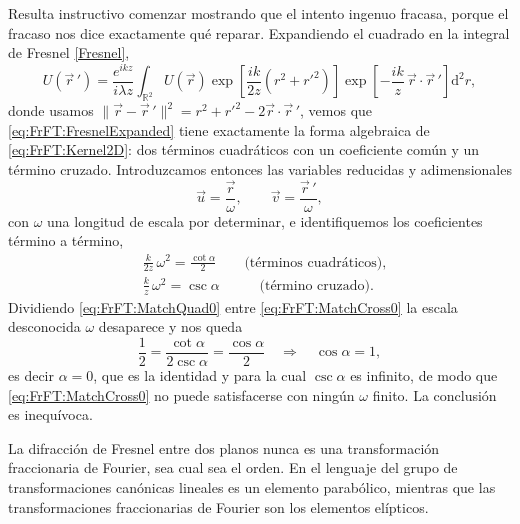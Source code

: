 			Resulta instructivo comenzar mostrando que el intento ingenuo fracasa, porque el fracaso nos dice exactamente qué reparar. Expandiendo el cuadrado en la integral de Fresnel \eqref{Fresnel},
			\begin{equation}\label{eq:FrFT:FresnelExpanded}
				U(\vec{r}\,') = \frac{e^{ikz}}{i\lambda z}\int_{\mathbb{R}^{2}} U(\vec{r})\exp\left[\frac{ik}{2z}\left(r^{2}+r'^{2}\right)\right]\exp\left[-\frac{ik}{z}\,\vec{r}\cdot\vec{r}\,'\right]\mathrm{d}^{2}r,
			\end{equation}
			donde usamos $\|\vec{r}-\vec{r}\,'\|^{2} = r^{2}+r'^{2}-2\vec{r}\cdot\vec{r}\,'$, vemos que \eqref{eq:FrFT:FresnelExpanded} tiene exactamente la forma algebraica de \eqref{eq:FrFT:Kernel2D}: dos términos cuadráticos con un coeficiente común y un término cruzado. Introduzcamos entonces las variables reducidas y adimensionales
			\begin{equation}\label{eq:FrFT:Reduced}
				\vec{u} = \frac{\vec{r}}{\omega}, \qquad \vec{v} = \frac{\vec{r}\,'}{\omega},
			\end{equation}
			con $\omega$ una longitud de escala por determinar, e identifiquemos los coeficientes término a término,
			\begin{align}
				& \frac{k}{2z}\,\omega^{2} = \frac{\cot\alpha}{2} \qquad \text{(términos cuadráticos)},\label{eq:FrFT:MatchQuad0}\\
				& \frac{k}{z}\,\omega^{2} = \csc\alpha \qquad\;\;\; \text{(término cruzado)}.\label{eq:FrFT:MatchCross0}
			\end{align}
			Dividiendo \eqref{eq:FrFT:MatchQuad0} entre \eqref{eq:FrFT:MatchCross0} la escala desconocida $\omega$ desaparece y nos queda
			\begin{equation*}
				\frac{1}{2} = \frac{\cot\alpha}{2\csc\alpha} = \frac{\cos\alpha}{2} \quad\Longrightarrow\quad \cos\alpha = 1,
			\end{equation*}
			es decir $\alpha = 0$, que es la identidad y para la cual $\csc\alpha$ es infinito, de modo que \eqref{eq:FrFT:MatchCross0} no puede satisfacerse con ningún $\omega$ finito. La conclusión es inequívoca.

			\begin{myteo}
				La difracción de Fresnel entre dos planos nunca es una transformación fraccionaria de Fourier, sea cual sea el orden. En el lenguaje del grupo de transformaciones canónicas lineales es un elemento parabólico, mientras que las transformaciones fraccionarias de Fourier son los elementos elípticos.
			\end{myteo}

